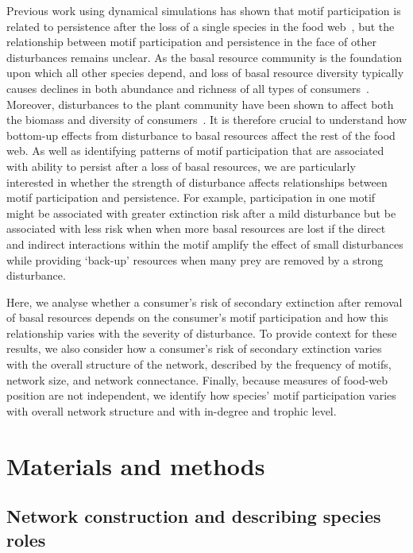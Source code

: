 \documentclass[12pt]{article}
\begin{document}
\begin{spacing}{2.0}
    Previous work using dynamical simulations has shown that motif participation is related to persistence after the loss of a single species in the food web~\citep{Cirtwill2022Oikos}, but the relationship between motif participation and persistence in the face of other disturbances remains unclear.
   As the basal resource community is the foundation upon which all other species depend, and loss of basal resource diversity typically causes declines in both abundance and richness of all types of consumers~\citep{scherber2010bottom,Dobson2009food,Georgiadis2007}.
    Moreover, disturbances to the plant community have been shown to affect both the biomass and diversity of consumers~\citep{chen2019plant,scherber2010bottom,li2020bottom}.
    It is therefore crucial to understand how bottom-up effects from disturbance to basal resources affect the rest of the food web.  
    As well as identifying patterns of motif participation that are associated with ability to persist after a loss of basal resources, we are particularly interested in whether the strength of  disturbance affects relationships between motif participation and persistence.
    For example, participation in one motif might be associated with greater extinction risk after a mild disturbance but be associated with less risk when when more basal resources are lost if the direct and indirect interactions within the motif amplify the effect of small disturbances while providing `back-up' resources when many prey are removed by a strong disturbance.

        
    Here, we analyse whether a consumer's risk of secondary extinction after removal of basal resources depends on the consumer's motif participation and how this relationship varies with the severity of disturbance.
    To provide context for these results, we also consider how a consumer's risk of secondary extinction varies with the overall structure of the network, described by the frequency of motifs, network size, and network connectance.
    Finally, because measures of food-web position are not independent, we identify how species' motif participation varies with overall network structure and with in-degree and trophic level.


\section*{Materials and methods}

    \subsection*{Network construction and describing species roles}


\end{spacing}
\end{document}
